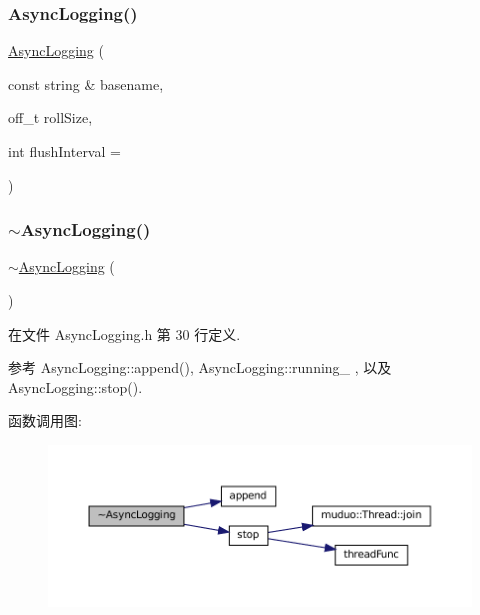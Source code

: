 \subsubsection{\texorpdfstring{Async\+Logging()}{AsyncLogging()}}
{\footnotesize\ttfamily \hyperlink{classmuduo_1_1AsyncLogging}{Async\+Logging} (\begin{DoxyParamCaption}\item[{const string \&}]{basename,  }\item[{off\+\_\+t}]{roll\+Size,  }\item[{int}]{flush\+Interval = {} }\end{DoxyParamCaption})}

\mbox{\label{classmuduo_1_1AsyncLogging_aa008935e7ad96a6ade750a9c5ec984b7}} 
\subsubsection{\texorpdfstring{$\sim$\+Async\+Logging()}{~AsyncLogging()}}
{\footnotesize\ttfamily $\sim$\hyperlink{classmuduo_1_1AsyncLogging}{Async\+Logging} (\begin{DoxyParamCaption}{ }\end{DoxyParamCaption})\hspace{0.3cm}{\ttfamily [inline]}}



在文件 Async\+Logging.\+h 第 30 行定义.



参考 Async\+Logging\+::append(), Async\+Logging\+::running\+\_\+ , 以及 Async\+Logging\+::stop().

函数调用图\+:
\nopagebreak
\begin{figure}[H]
\begin{center}
\leavevmode
\includegraphics[width=350pt]{classmuduo_1_1AsyncLogging_aa008935e7ad96a6ade750a9c5ec984b7_cgraph}
\end{center}
\end{figure}


